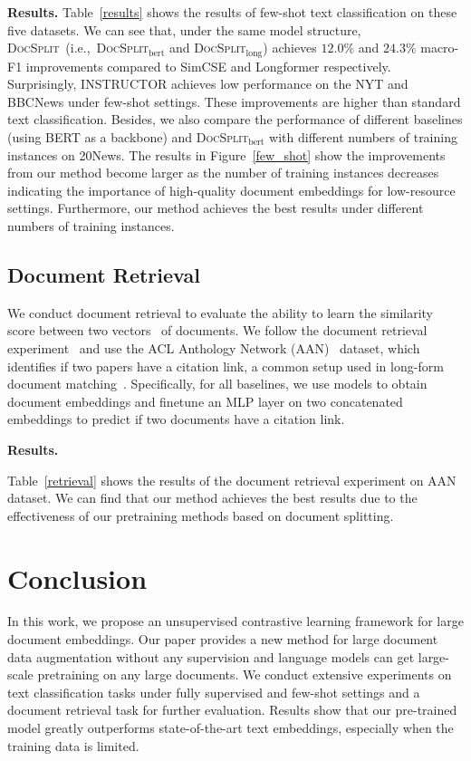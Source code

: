 \documentclass[11pt]{article}
\newcommand{\our}{\mbox{\textsc{DocSplit}}}
\begin{document}
\textbf{Results.} 
Table~\ref{results} shows the results of few-shot text classification on these five datasets. 
We can see that, under the same model structure, \our~(i.e.,~\our$_{\mathrm{bert}}$ and \our$_{\mathrm{long}}$) achieves $12.0\%$ and $24.3\%$ macro-F1 improvements compared to SimCSE and Longformer respectively. 
Surprisingly, INSTRUCTOR achieves low performance on the NYT and BBCNews under few-shot settings.
These improvements are higher than standard text classification. 
Besides, we also compare the performance of different baselines (using BERT as a backbone) and \our$_{\mathrm{bert}}$ with different numbers of training instances on 20News. 
The results in Figure~\ref{few_shot} show the improvements from our method become larger as the number of training instances decreases indicating the importance of high-quality document embeddings for low-resource settings. 
Furthermore, our method achieves the best results under different numbers of training instances.

\subsection{Document Retrieval}
We conduct document retrieval to evaluate the ability to learn the similarity score between two vectors~\cite{Guo2016ADR} of documents. We follow the document retrieval experiment~\cite{Tay2020LongRA} and use the ACL Anthology Network (AAN)~\cite{Radev2009TheAA} dataset, which identifies if two papers have a citation link, a common setup used in long-form document matching~\cite{Jiang2019SemanticTM,Yang2020Beyond5T}.
Specifically, for all baselines, we use models to obtain document embeddings and finetune an MLP layer on two concatenated embeddings to predict if two documents have a citation link.

\textbf{Results.} 
\begin{table}
    \centering
    
    \caption{}
    \vspace{-3mm}
    \label{retrieval}
\end{table}
Table~\ref{retrieval} shows the results of the document retrieval experiment on AAN dataset.
We can find that our method achieves the best results due to the effectiveness of our pretraining methods based on document splitting.

\section{Conclusion}
\label{sec:conclusion}
In this work, we propose an unsupervised contrastive learning framework for large document embeddings. 
Our paper provides a new method for large document data augmentation without any supervision and language models can get large-scale pretraining on any large documents. 
We conduct extensive experiments on text classification tasks under fully supervised and few-shot settings and a document retrieval task for further evaluation.
Results show that our pre-trained model greatly outperforms state-of-the-art text embeddings, especially when the training data is limited.
\end{document}
